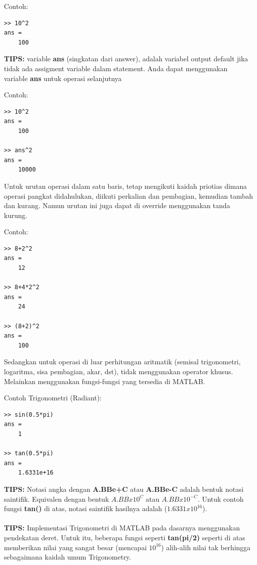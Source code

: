 \documentclass[12pt]{book}
\begin{document}
	Contoh:
	\begin{verbatim}
>> 10^2
ans = 
    100
	\end{verbatim}
	
	\textbf{TIPS:} variable \textbf{ans} (singkatan dari answer), adalah variabel output default jika tidak ada assigment variable dalam statement.
	Anda dapat menggunakan variable \textbf{ans} untuk operasi selanjutnya
	
	Contoh:
	\begin{verbatim}
>> 10^2
ans = 
    100
	
>> ans^2
ans = 
    10000
	\end{verbatim}

	Untuk urutan operasi dalam satu baris, tetap mengikuti kaidah priotias dimana operasi pangkat didahulukan, diikuti perkalian dan pembagian, kemudian tambah dan kurang.
	Namun urutan ini juga dapat di override menggunakan tanda kurung.
	
	Contoh:
	\begin{verbatim}
>> 8+2^2
ans = 
    12

>> 8+4*2^2
ans = 
    24
	
>> (8+2)^2
ans =
    100
	\end{verbatim}

	Sedangkan untuk operasi di luar perhitungan aritmatik (semisal trigonometri, logaritma, sisa pembagian, akar, dst), tidak menggunakan operator khusus.
	Melainkan menggunakan fungsi-fungsi yang tersedia di MATLAB.
	
	Contoh Trigonometri (Radiant):
	\begin{verbatim}
>> sin(0.5*pi)
ans = 
    1
    
>> tan(0.5*pi)
ans = 
    1.6331e+16
	\end{verbatim}

	\textbf{TIPS:} Notasi angka dengan \textbf{A.BBe+C} atau \textbf{A.BBe-C} adalah bentuk notasi saintifik.
	Equivalen dengan bentuk $A.BB x 10^C$ atau $A.BB x 10^{-C}$.
	Untuk contoh fungsi \textbf{tan()} di atas, notasi saintifik hasilnya adalah (\textbf{$1.6331x10^{16}$}).
	\\
	\\
	\textbf{TIPS:} Implementasi Trigonometri di MATLAB pada dasarnya menggunakan pendekatan deret.
	Untuk itu, beberapa fungsi seperti \textbf{tan(pi/2)} seperti di atas memberikan nilai yang sangat besar (mencapai $10^{16}$)
	alih-alih nilai tak berhingga sebagaimana kaidah umum Trigonometry.
	
\end{document}
